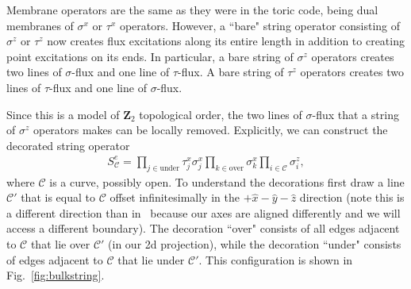\documentclass[twocolumn, longbibliography]{revtex4-2}
\newcommand{\C}{\mathcal{C}}
\begin{document}
Membrane operators are the same as they were in the toric code, being dual membranes of $\sigma^x$ or $\tau^x$ operators. However, a ``bare" string operator consisting of $\sigma^z$ or $\tau^z$ now creates flux excitations along its entire length in addition to creating point excitations on its ends. In particular, a bare string of $\sigma^z$ operators creates two lines of $\sigma$-flux and one line of $\tau$-flux. A bare string of $\tau^z$ operators creates two lines of $\tau$-flux and one line of $\sigma$-flux.

Since this is a model of $\mathbf{Z}_2$ topological order, the two lines of $\sigma$-flux that a string of $\sigma^z$ operators makes can be locally removed. Explicitly, we can construct the decorated string operator
\begin{align}
S^e_\mathcal{C} = \prod_{j\in\text{under}} \tau^x_j \sigma^x_j \prod_{k\in\text{over}} \sigma^x_k \prod_{i\in\mathcal{C}}\sigma^z_i,
\end{align}
where $\mathcal{C}$ is a curve, possibly open. To understand the decorations first draw a line $\mathcal{C}'$ that is equal to $\mathcal{C}$ offset infinitesimally in the $+\hat{x}-\hat{y}-\hat{z}$ direction (note this is a different direction than in~\cite{BurnellSoluble} because our axes are aligned differently and we will access a different boundary). The decoration ``over" consists of all edges adjacent to $\C$ that lie over $\C'$ (in our 2d projection), while the decoration ``under" consists of edges adjacent to $\C$ that lie under $\C'$. This configuration is shown in Fig.~\ref{fig:bulkstring}. 
\end{document}
